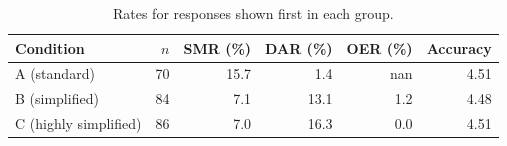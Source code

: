 \begin{table}[H]
\caption{Rates for responses shown first in each group.}
\label{tab:sens:first}
\centering
\begin{tabular}{lrrrrr}
\toprule
Condition & $n$ & SMR (\%) & DAR (\%) & OER (\%) & Accuracy \\
\midrule
A (standard) & 70 & 15.7 & 1.4 & nan & 4.51 \\
B (simplified) & 84 & 7.1 & 13.1 & 1.2 & 4.48 \\
C (highly simplified) & 86 & 7.0 & 16.3 & 0.0 & 4.51 \\
\bottomrule
\end{tabular}
\end{table}
